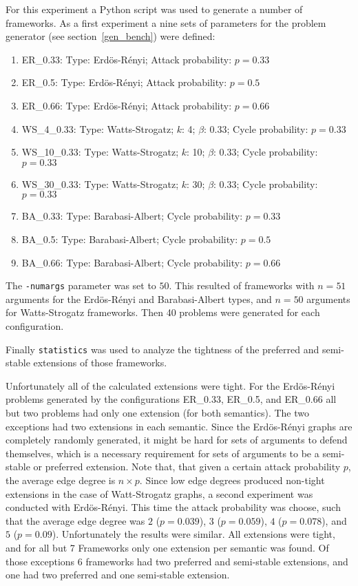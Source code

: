 \documentclass[parskip=half]{scrartcl}
\begin{document}
For this experiment a Python script was used to generate a number of frameworks.
As a first experiment a nine sets of parameters for the problem generator (see section~\ref{gen_bench})
were defined:
\begin{enumerate}
  \item ER\_0.33: Type: Erdös-Rényi; Attack probability: $p=0.33$
  \item ER\_0.5: Type: Erdös-Rényi; Attack probability: $p=0.5$
  \item ER\_0.66: Type: Erdös-Rényi; Attack probability: $p=0.66$
  \item WS\_4\_0.33: Type: Watts-Strogatz; $k$: 4; $\beta$: 0.33; Cycle probability: $p=0.33$
  \item WS\_10\_0.33: Type: Watts-Strogatz; $k$: 10; $\beta$: 0.33; Cycle probability: $p=0.33$
  \item WS\_30\_0.33: Type: Watts-Strogatz; $k$: 30; $\beta$: 0.33; Cycle probability: $p=0.33$
  \item BA\_0.33: Type: Barabasi-Albert; Cycle probability: $p=0.33$
  \item BA\_0.5: Type: Barabasi-Albert; Cycle probability: $p=0.5$
  \item BA\_0.66: Type: Barabasi-Albert; Cycle probability: $p=0.66$
\end{enumerate}
The \texttt{-numargs} parameter was set to $50$. This resulted of frameworks with
$n=51$ arguments for the Erdös-Rényi and Barabasi-Albert types, and $n=50$ arguments for
Watts-Strogatz frameworks. Then 40 problems were generated for each configuration.

Finally \texttt{statistics} was used to analyze the tightness of the preferred and
semi-stable extensions of those frameworks.

Unfortunately all of the calculated extensions were tight.
For the Erdös-Rényi problems generated by the configurations ER\_0.33, ER\_0.5, and ER\_0.66
all but two problems had only one extension (for both semantics).
The two exceptions had two extensions in each semantic.
Since the Erdös-Rényi graphs are completely randomly generated, it might be hard for sets of
arguments to defend themselves, which is a necessary requirement for sets of arguments to
be a semi-stable or preferred extension.
Note that, that given a certain attack probability $p$, the average edge degree is
$n\times p$. Since low edge degrees produced non-tight extensions in the case of Watt-Strogatz
graphs, a second experiment was conducted with Erdös-Rényi. This time the
attack probability was choose, such that the average edge degree was $2$
($p=0.039$), $3$ ($p=0.059$), $4$ ($p=0.078$), and $5$ ($p=0.09$).
Unfortunately the results were similar. All extensions were tight, and for all but 7 Frameworks
only one extension per semantic was found. Of those exceptions 6 frameworks had two preferred and
semi-stable extensions, and one had two preferred and one semi-stable extension.
\end{document}
